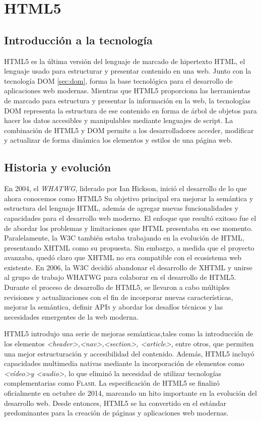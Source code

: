 \documentclass[a4paper, 11pt]{book}
\begin{document}
\section{HTML5}
\label{sec:html5}
\subsection{Introducción a la tecnología}
\textsc{HTML5} es la última versión del lenguaje de marcado de hipertexto \textsc{HTML}, el lenguaje usado para estructurar y presentar contenido en una web. Junto con la tecnología \textsc{DOM} \ref{sec:dom}, forma la base tecnológica para el desarrollo de aplicaciones web modernas. Mientras que \textsc{HTML5} proporciona las herramientas de marcado para estructura y presentar la información en la web, la tecnologías \textsc{DOM} representa la estructura de ese contenido en forma de árbol de objetos para hacer los datos accesibles y manipulables mediante lenguajes de script.
La combinación de \textsc{HTML5} y \textsc{DOM} permite a los desarrolladores acceder, modificar y actualizar de forma dinámica los elementos y estilos de una página web.
\subsection{Historia y evolución}
En 2004, el \emph{WHATWG}, liderado por Ian Hickson, inició el desarrollo de lo que ahora conocemos como \textsc{HTML5}  Su objetivo principal era mejorar la semántica y estructura del lenguaje \textsc{HTML}, además de agregar nuevas funcionalidades y capacidades para el desarrollo web moderno. El enfoque que resultó exitoso fue el de abordar los problemas y limitaciones que \textsc{HTML} presentaba en ese momento.
Paralelamente, la \textsc{W3C} también estaba trabajando en la evolución de \textsc{HTML}, presentando \textsc{XHTML} como su propuesta. Sin embargo, a medida que el proyecto avanzaba, quedó claro que \textsc{XHTML} no era compatible con el ecosistema web existente.
En 2006, la \textsc{W3C} decidió abandonar el desarrollo de \textsc{XHTML} y unirse al grupo de trabajo \textsc{WHATWG} para colaborar en el desarrollo de \textsc{HTML5}.
Durante el proceso de desarrollo de \textsc{HTML5}, se llevaron a cabo múltiples revisiones y actualizaciones con el fin de incorporar nuevas características, mejorar la semántica, definir \textsc{APIs} y abordar los desafíos técnicos y las necesidades emergentes de la web moderna.

\textsc{HTML5} introdujo una serie de mejoras semánticas,tales como la introducción de los elementos \emph{\textless header\textgreater ,\textless nav\textgreater,\textless section\textgreater, \textless article\textgreater}, entre otros, que permiten una mejor estructuración y accesibilidad del contenido. Además, \textsc{HTML5} incluyó capacidades multimedia nativas mediante la incorporación de elementos como \emph{\textless vídeo\textgreater y \textless audio\textgreater}, lo que eliminó la necesidad de utilizar tecnologías complementarias como \textsc{Flash}.
La especificación de \textsc{HTML5} se finalizó oficialmente en octubre de 2014, marcando un hito importante en la evolución del desarrollo web.
Desde entonces, \textsc{HTML5} se ha convertido en el estándar predominantes para la creación de páginas y aplicaciones web modernas.
\end{document}
